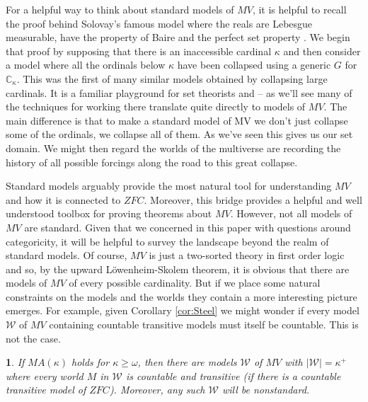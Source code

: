 \documentclass[10pt,a4paper]{amsart}
\numberwithin{equation}{section}
\numberwithin{figure}{section}
\theoremstyle{plain}
\theoremstyle{plain}
\theoremstyle{plain}
\theoremstyle{plain}
\newtheorem{prop}[thm]{\protect\propositionname}
\theoremstyle{remark}
\theoremstyle{plain}
\theoremstyle{definition}
\providecommand{\propositionname}{Proposition}
\begin{document}
For a helpful way to think about standard models of $MV$, it is helpful
to recall the proof behind Solovay's famous model where the reals
are Lebesgue measurable, have the property of Baire and the perfect
set property \citep{Solovay1970AMO}. We begin that proof by supposing
that there is an inaccessible cardinal $\kappa$ and then consider
a model where all the ordinals below $\kappa$ have been collapsed
using a generic $G$ for $\mathbb{C}_{\kappa}$. This was the first
of many similar models obtained by collapsing large cardinals. It
is a familiar playground for set theorists and -- as we'll see many
of the techniques for working there translate quite directly to models
of $MV$. The main difference is that to make a standard model of
MV we don't just collapse some of the ordinals, we collapse all of
them. As we've seen this gives us our set domain. We might then regard
the worlds of the multiverse are recording the history of all possible
forcings along the road to this great collapse.

Standard models arguably provide the most natural tool for understanding
$MV$ and how it is connected to $ZFC$. Moreover, this bridge provides
a helpful and well understood toolbox for proving theorems about $MV$.
However, not all models of $MV$ are standard. Given that we concerned
in this paper with questions around categoricity, it will be helpful
to survey the landscape beyond the realm of standard models. Of course,
$MV$ is just a two-sorted theory in first order logic and so, by
the upward L\"{o}wenheim-Skolem theorem, it is obvious that there are
models of $MV$ of every possible cardinality. But if we place some
natural constraints on the models and the worlds they contain a more
interesting picture emerges. For example, given Corollary \ref{cor:Steel}
we might wonder if every model $\mathcal{W}$ of $MV$ containing
countable transitive models must itself be countable. This is not
the case. 
\begin{prop}
If $MA(\kappa)$ holds for $\kappa\geq\omega$, then there are models
$\mathcal{W}$ of $MV$ with $|\mathcal{W}|=\kappa^{+}$ where every
world $M$ in $\mathcal{W}$ is countable and transitive (if there
is a countable transitive model of $ZFC$). Moreover, any such $\mathcal{W}$
will be nonstandard. 
\end{prop}
\end{document}
